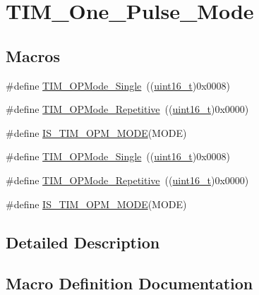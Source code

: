 \hypertarget{group___t_i_m___one___pulse___mode}{}\section{T\+I\+M\+\_\+\+One\+\_\+\+Pulse\+\_\+\+Mode}
\label{group___t_i_m___one___pulse___mode}
\subsection*{Macros}
\begin{DoxyCompactItemize}
\item 
\#define \hyperlink{group___t_i_m___one___pulse___mode_ga99d934fdbc54ea4ee2cf5c86860f9227}{T\+I\+M\+\_\+\+O\+P\+Mode\+\_\+\+Single}~((\hyperlink{_p_e___types_8h_a1f1825b69244eb3ad2c7165ddc99c956}{uint16\+\_\+t})0x0008)
\item 
\#define \hyperlink{group___t_i_m___one___pulse___mode_gad921d739c86bf48dca12442a81ad68ad}{T\+I\+M\+\_\+\+O\+P\+Mode\+\_\+\+Repetitive}~((\hyperlink{_p_e___types_8h_a1f1825b69244eb3ad2c7165ddc99c956}{uint16\+\_\+t})0x0000)
\item 
\#define \hyperlink{group___t_i_m___one___pulse___mode_ga3f4a4305b4feacb4322eb4a358e54637}{I\+S\+\_\+\+T\+I\+M\+\_\+\+O\+P\+M\+\_\+\+M\+O\+DE}(M\+O\+DE)
\item 
\#define \hyperlink{group___t_i_m___one___pulse___mode_ga99d934fdbc54ea4ee2cf5c86860f9227}{T\+I\+M\+\_\+\+O\+P\+Mode\+\_\+\+Single}~((\hyperlink{_p_e___types_8h_a1f1825b69244eb3ad2c7165ddc99c956}{uint16\+\_\+t})0x0008)
\item 
\#define \hyperlink{group___t_i_m___one___pulse___mode_gad921d739c86bf48dca12442a81ad68ad}{T\+I\+M\+\_\+\+O\+P\+Mode\+\_\+\+Repetitive}~((\hyperlink{_p_e___types_8h_a1f1825b69244eb3ad2c7165ddc99c956}{uint16\+\_\+t})0x0000)
\item 
\#define \hyperlink{group___t_i_m___one___pulse___mode_ga3f4a4305b4feacb4322eb4a358e54637}{I\+S\+\_\+\+T\+I\+M\+\_\+\+O\+P\+M\+\_\+\+M\+O\+DE}(M\+O\+DE)
\end{DoxyCompactItemize}


\subsection{Detailed Description}


\subsection{Macro Definition Documentation}
